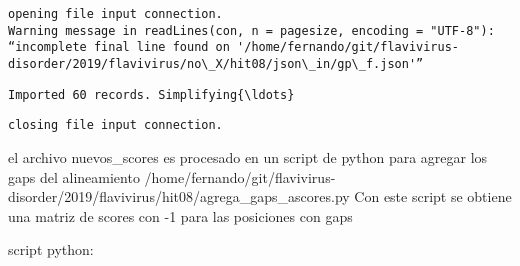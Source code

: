 \documentclass[11pt]{article}
\begin{document}
    \begin{Verbatim}[commandchars=\\\{\}]
opening file input connection.
Warning message in readLines(con, n = pagesize, encoding = "UTF-8"):
“incomplete final line found on '/home/fernando/git/flavivirus-disorder/2019/flavivirus/no\_X/hit08/json\_in/gp\_f.json'”
    \end{Verbatim}

    \begin{Verbatim}[commandchars=\\\{\}]
 Imported 60 records. Simplifying{\ldots}

    \end{Verbatim}

    \begin{Verbatim}[commandchars=\\\{\}]
closing file input connection.

    \end{Verbatim}

    el archivo nuevos\_scores es procesado en un script de python para
agregar los gaps del alineamiento
/home/fernando/git/flavivirus-disorder/2019/flavivirus/hit08/agrega\_gaps\_ascores.py
Con este script se obtiene una matriz de scores con -1 para las
posiciones con gaps

script python:
\end{document}
